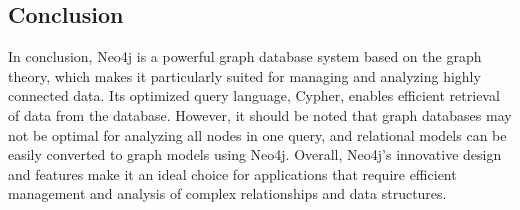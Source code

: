 \subsection{Conclusion} \label{subsec:conclusionNeo4j}

In conclusion, Neo4j is a powerful graph database system based on the graph theory, which makes it particularly suited for managing and analyzing highly connected data. Its optimized query language, Cypher, enables efficient retrieval of data from the database. However, it should be noted that graph databases may not be optimal for analyzing all nodes in one query, and relational models can be easily converted to graph models using Neo4j. Overall, Neo4j's innovative design and features make it an ideal choice for applications that require efficient management and analysis of complex relationships and data structures.

